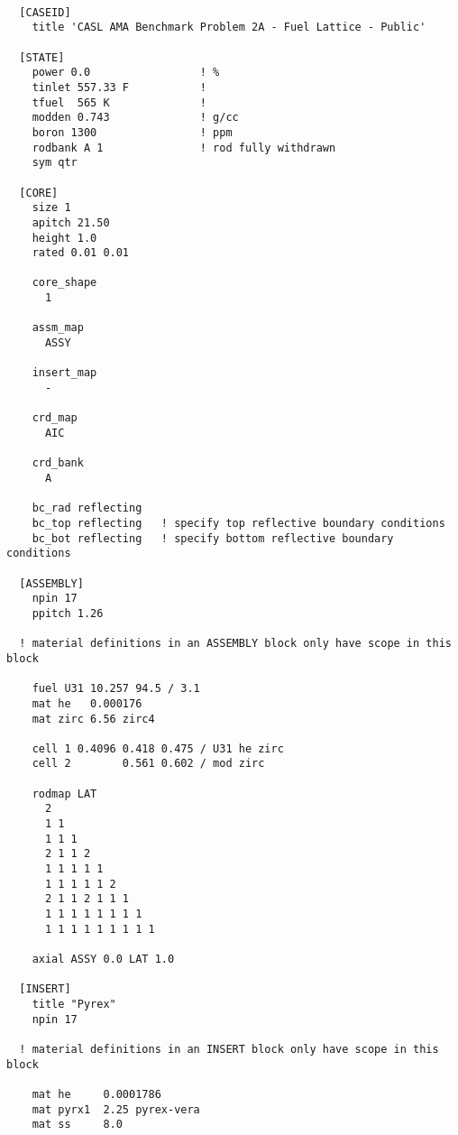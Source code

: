 %
%
%
\begin{verbatim}

  [CASEID]
    title 'CASL AMA Benchmark Problem 2A - Fuel Lattice - Public'

  [STATE]
    power 0.0                 ! %
    tinlet 557.33 F           !
    tfuel  565 K              !
    modden 0.743              ! g/cc
    boron 1300                ! ppm
    rodbank A 1               ! rod fully withdrawn
    sym qtr

  [CORE]
    size 1
    apitch 21.50
    height 1.0
    rated 0.01 0.01

    core_shape
      1

    assm_map
      ASSY

    insert_map
      -

    crd_map
      AIC

    crd_bank
      A

    bc_rad reflecting
    bc_top reflecting   ! specify top reflective boundary conditions
    bc_bot reflecting   ! specify bottom reflective boundary conditions

  [ASSEMBLY]
    npin 17
    ppitch 1.26

  ! material definitions in an ASSEMBLY block only have scope in this block

    fuel U31 10.257 94.5 / 3.1
    mat he   0.000176
    mat zirc 6.56 zirc4

    cell 1 0.4096 0.418 0.475 / U31 he zirc
    cell 2        0.561 0.602 / mod zirc

    rodmap LAT
      2
      1 1
      1 1 1
      2 1 1 2
      1 1 1 1 1
      1 1 1 1 1 2
      2 1 1 2 1 1 1
      1 1 1 1 1 1 1 1
      1 1 1 1 1 1 1 1 1

    axial ASSY 0.0 LAT 1.0

  [INSERT]
    title "Pyrex"
    npin 17

  ! material definitions in an INSERT block only have scope in this block

    mat he     0.0001786
    mat pyrx1  2.25 pyrex-vera
    mat ss     8.0


\end{verbatim}
